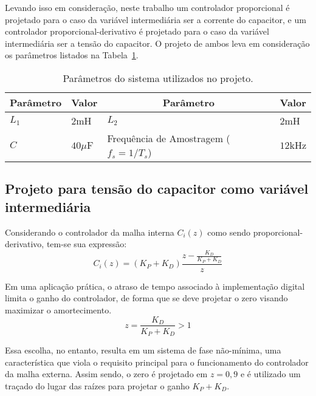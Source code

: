     Levando isso em consideração, neste trabalho um controlador proporcional é projetado para o caso da variável intermediária ser a corrente do capacitor, e um controlador proporcional-derivativo é projetado para o caso da variável intermediária ser a tensão do capacitor. O projeto de ambos leva em consideração os parâmetros listados na Tabela~\ref{tab:sim_parameters}.

    \begin{table}[htb]
        \renewcommand{\arraystretch}{1.35}
        \setlength{\tabcolsep}{1.2mm}
        \caption{Parâmetros do sistema utilizados no projeto.}
        \label{tab:sim_parameters}
        \centering
        \begin{tabular}{l l l l}
            \hline
            \multicolumn{1}{c}{Parâmetro} & \multicolumn{1}{c}{Valor} &
            \multicolumn{1}{c}{Parâmetro} & \multicolumn{1}{c}{Valor} \\
            \hline
            $L_1$ &  $2$mH     &  $L_2$      &  $2$mH    \\
            $C$   &  $40\mu$F  & Frequência de Amostragem ($f_s = 1/T_s$) &  $12$kHz  \\
            \hline
        \end{tabular}
    \end{table}


\subsection{Projeto para tensão do capacitor como variável intermediária}

    Considerando o controlador da malha interna $C_i(z)$ como sendo proporcional-derivativo, tem-se sua expressão:
    \begin{equation}
        C_i(z) = \left( K_P + K_D \right) \frac{z- \frac{K_D}{K_P+K_D}}{z}
    \end{equation}

    Em uma aplicação prática, o atraso de tempo associado à implementação digital limita o ganho do controlador, de forma que se deve projetar o zero visando maximizar o amortecimento.
    \begin{equation}
        z = \frac{K_D}{K_P+K_D} > 1
    \end{equation}

    Essa escolha, no entanto, resulta em um sistema de fase não-mínima, uma característica que viola o requisito principal para o funcionamento do controlador da malha externa. Assim sendo, o zero é projetado em $z=0,9$ e é utilizado um traçado do lugar das raízes para projetar o ganho $K_P+K_D$.

